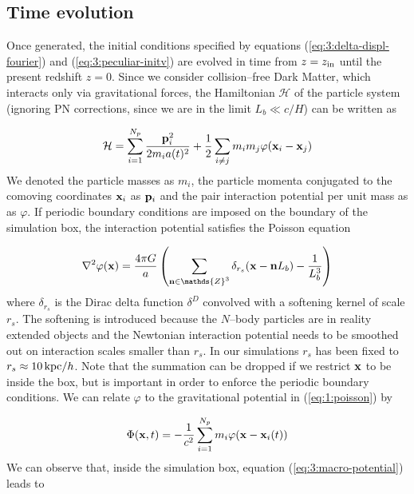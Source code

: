 \subsection{Time evolution}
Once generated, the initial conditions specified by equations (\ref{eq:3:delta-displ-fourier}) and (\ref{eq:3:peculiar-initv}) are evolved in time from $z=z_{\rm in}$ until the present redshift $z=0$. Since we consider collision--free Dark Matter, which interacts only via gravitational forces, the Hamiltonian $\mathcal{H}$ of the particle system (ignoring PN corrections, since we are in the limit $L_b\ll c/H$) can be written as 

\begin{equation}
\label{eq:3:collisionless-ham}
\mathcal{H} = \sum_{i=1}^{N_p} \frac{\mathbf{p}_i^2}{2m_i a(t)^2} + \frac{1}{2}\sum_{i\neq j}m_im_j\varphi(\mathbf{x}_i-\mathbf{x}_j)
\end{equation} 
%
We denoted the particle masses as $m_i$, the particle momenta conjugated to the comoving coordinates $\mathbf{x}_i$ as $\mathbf{p}_i$ and the pair interaction potential per unit mass as as $\varphi$. If periodic boundary conditions are imposed on the boundary of the simulation box, the interaction potential satisfies the Poisson equation

\begin{equation}
\label{eq:3:part-poisson}
\nabla^2\varphi(\bb{x}) = \frac{4\pi G}{a}\left(\sum_{\bb{n}\in\mathds{Z}^3}\delta_{r_s}(\bb{x}-\bb{n}L_b)-\frac{1}{L_b^3}\right) 
\end{equation}
%
where $\delta_{r_s}$ is the Dirac delta function $\delta^D$ convolved with a softening kernel of scale $r_s$. The softening is introduced because the $N$--body particles are in reality extended objects and the Newtonian interaction potential needs to be smoothed out on interaction scales smaller than $r_s$. In our simulations $r_s$ has been fixed to $r_s\approx 10\,{\rm kpc}/h$. Note that the summation can be dropped if we restrict $\mathbf{x}$ to be inside the box, but is important in order to enforce the periodic boundary conditions. We can relate $\varphi$ to the gravitational potential in (\ref{eq:1:poisson}) by    

\begin{equation}
\label{eq:3:macro-potential}
\Phi(\mathbf{x},t) = -\frac{1}{c^2}\sum_{i=1}^{N_p} m_i\varphi(\mathbf{x}-\mathbf{x}_i(t))
\end{equation} 
%
We can observe that, inside the simulation box, equation (\ref{eq:3:macro-potential}) leads to 

